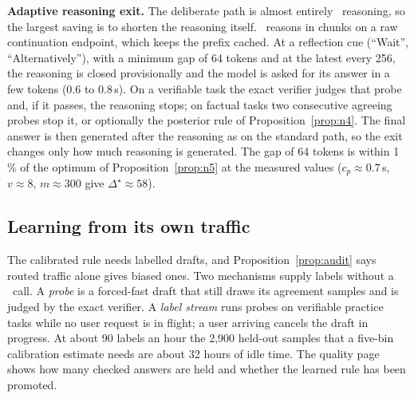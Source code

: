 \textbf{Adaptive reasoning exit.} The deliberate path is almost entirely
\Stwo\ reasoning, so the largest saving is to shorten the reasoning itself.
\Stwo\ reasons in chunks on a raw continuation endpoint, which keeps the
prefix cached. At a reflection cue (``Wait'', ``Alternatively''), with a
minimum gap of 64 tokens and at the latest every 256, the reasoning is closed
provisionally and the model is asked for its answer in a few tokens (0.6 to
0.8\,s). On a verifiable task the exact verifier judges that probe and, if it
passes, the reasoning stops; on factual tasks two consecutive agreeing probes
stop it, or optionally the posterior rule of Proposition~\ref{prop:n4}. The
final answer is then generated after the reasoning as on the standard path, so
the exit changes only how much reasoning is generated. The gap of 64 tokens is
within 1\,\% of the optimum of Proposition~\ref{prop:n5} at the measured
values ($c_p\approx0.7$\,s, $v\approx8$, $m\approx300$ give
$\Delta^\star\approx58$).

\subsection{Learning from its own traffic}
\label{sec:gate:labels}
The calibrated rule needs labelled drafts, and Proposition~\ref{prop:audit}
says routed traffic alone gives biased ones. Two mechanisms supply labels
without a \Stwo\ call. A \emph{probe} is a forced-fast draft that still draws
its agreement samples and is judged by the exact verifier. A \emph{label
stream} runs probes on verifiable practice tasks while no user request is in
flight; a user arriving cancels the draft in progress. At about 90 labels an
hour the 2,900 held-out samples that a five-bin calibration estimate needs
are about 32 hours of idle time. The quality page shows how many checked
answers are held and whether the learned rule has been promoted.
